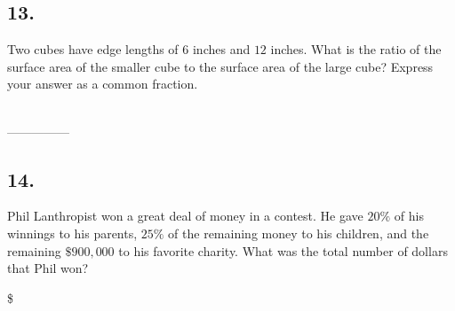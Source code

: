 \documentclass[12pt]{article}
\newenvironment{answer}{\vspace{1em}}{}
\newenvironment{answer}{\vspace{0em}\expandafter\comment}{\expandafter\endcomment}
\newlength{\currentparskip}
\newlength{\currentparindent}
\newenvironment{minipagex}[2][]
  {\setlength{\currentparskip}{\parskip}%
    \setlength{\currentparindent}{\parindent}%
   \begin{minipage}[#1]{#2}%
   \setlength{\parskip}{\currentparskip}%
   \setlength{\parindent}{\currentparindent}%
  }
  {\end{minipage}}
\begin{document}
\subsection*{13.}
Two cubes have edge lengths of $6$ inches and $12$ inches. What is the ratio of the surface area of the smaller cube to the surface area of the large cube? Express your answer as a common fraction. 

\fbox{\phantom{ANSWER}}\\
\mbox{---------------}\\
\fbox{\phantom{ANSWER}}

\begin{answer}
%
\end{answer}


\subsection*{14.}
Phil Lanthropist won a great deal of money in a contest. He gave $20\%$ of his winnings to his parents, $25\%$ of the remaining money to his children, and the remaining $\$900,000$ to his favorite charity. What was the total number of dollars that Phil won?

\$~\fbox{\phantom{ANSWER}}
\end{document}
